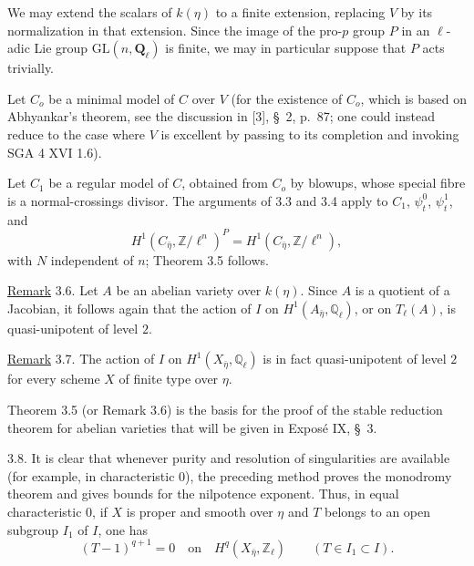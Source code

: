 
We may extend the scalars of $k(\eta)$ to a finite extension, replacing
$V$ by its normalization in that extension. Since the image of the
pro-$p$ group $P$ in an $\ell$-adic Lie group
$\mathrm{GL}(n,\mathbf Q_\ell)$ is finite, we may in particular suppose
that $P$ acts trivially.

Let $C_o$ be a minimal model of $C$ over $V$ (for the existence of
$C_o$, which is based on Abhyankar's theorem, see the discussion in [3],
\S~2, p.~87; one could instead reduce to the case where $V$ is excellent
by passing to its completion and invoking SGA 4 XVI 1.6).

Let $C_1$ be a regular model of $C$, obtained from $C_o$ by blowups, whose
special fibre is a normal-crossings divisor. The arguments of 3.3 and
3.4 apply to $C_1$, $\psi_t^0$, $\psi_t^1$, and
\[
H^1(C_{\bar\eta},\mathbb Z/\ell^n)^P
=H^1(C_{\bar\eta},\mathbb Z/\ell^n),
\]
with $N$ independent of $n$; Theorem 3.5 follows.

\underline{Remark} 3.6. Let $A$ be an abelian variety over $k(\eta)$.
Since $A$ is a quotient of a Jacobian, it follows again that the action
of $I$ on $H^1(A_{\bar\eta},\mathbb Q_\ell)$, or on $T_\ell(A)$, is
quasi-unipotent of level $2$.

\underline{Remark} 3.7. The action of $I$ on
$H^1(X_{\bar\eta},\mathbb Q_\ell)$ is in fact quasi-unipotent of level
$2$ for every scheme $X$ of finite type over $\eta$.

Theorem 3.5 (or Remark 3.6) is the basis for the proof of the stable
reduction theorem for abelian varieties that will be given in Expos\'{e}
IX, \S~3.

3.8. It is clear that whenever purity and resolution of singularities
are available (for example, in characteristic $0$), the preceding method
proves the monodromy theorem and gives bounds for the nilpotence
exponent. Thus, in equal characteristic $0$, if $X$ is proper and smooth
over $\eta$ and $T$ belongs to an open subgroup $I_1$ of $I$, one has
\begin{equation*}
(T-1)^{q+1}=0
\quad\text{on}\quad H^q(X_{\bar\eta},\mathbb Z_\ell)
\qquad(T\in I_1\subset I).
\end{equation*}

